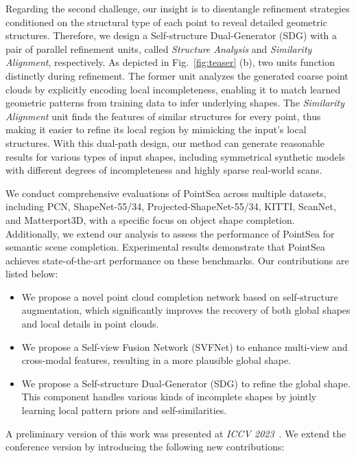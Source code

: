 Regarding the second challenge, our insight is to disentangle refinement strategies conditioned on the structural type of each point to reveal detailed geometric structures.
Therefore, we design a Self-structure Dual-Generator (SDG) with a pair of parallel refinement units, called \emph{Structure Analysis} and \emph{Similarity Alignment}, respectively. 
As depicted in Fig.~\ref{fig:teaser} (b), two units function distinctly during refinement.
The former unit analyzes the generated coarse point clouds by explicitly encoding local incompleteness, enabling it to match learned geometric patterns from training data to infer underlying shapes.
The \emph{Similarity Alignment} unit finds the features of similar structures for every point, thus making it easier to refine its local region by mimicking the input's local structures. 
With this dual-path design, our method can generate reasonable results for various types of input shapes, including symmetrical synthetic models with different degrees of incompleteness and highly sparse real-world scans.

We conduct comprehensive evaluations of PointSea across multiple datasets, including PCN, ShapeNet-55/34, Projected-ShapeNet-55/34, KITTI, ScanNet, and Matterport3D, with a specific focus on object shape completion. Additionally, we extend our analysis to assess the performance of PointSea for semantic scene completion. Experimental results demonstrate that PointSea achieves state-of-the-art performance on these benchmarks.
Our contributions are listed below:
\begin{itemize}
  \item 
  We propose a novel point cloud completion network based on self-structure augmentation, which significantly improves the recovery of both global shapes and local details in point clouds.
  \item 
  We propose a Self-view Fusion Network (SVFNet) to enhance multi-view and cross-modal features, resulting in a more plausible global shape.
  \item 
  We propose a Self-structure Dual-Generator (SDG) to refine the global shape. This component handles various kinds of incomplete shapes by jointly learning local pattern priors and self-similarities.
\end{itemize}

A preliminary version of this work was presented at \textit{ICCV 2023}~\citep{Zhu_2023_ICCV}. We extend the conference version by introducing the following new contributions:
%

